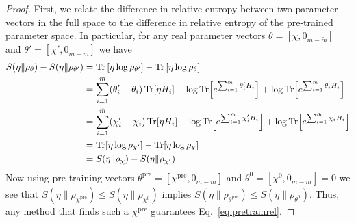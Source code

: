 \documentclass[
    aps,
    prx,
    onecolumn
]{revtex4-2}
\begin{document}
\begin{proof}
First, we relate the difference in relative entropy between two parameter vectors in the full space to the difference in relative entropy of the pre-trained parameter space. In particular, for any real parameter vectors $\theta = [\chi, 0_{m-\tilde{m}}]$ and $\theta' = [\chi', 0_{m-\tilde{m}}]$ we have
\begin{align}
\begin{split}
    S(\eta \|\rho_{\theta}) - S(\eta \|\rho_{\theta'}) &= \Tr\left[\eta \log \rho_{\theta'}\right] - \Tr\left[\eta \log \rho_\theta\right]\\
    &=\sum_{i=1}^m(\theta_i'-\theta_i)\Tr[\eta H_i] - \log\Tr[e^{\sum_{i=1}^m\theta_i'H_i}] + \log\Tr[e^{\sum_{i=1}^m\theta_iH_i}] \\
    &= \sum_{i=1}^{\tilde{m}}(\chi_i'-\chi_i)\Tr[\eta H_i] - \log\Tr[e^{\sum_{i=1}^{\tilde{m}}\chi_i'H_i}] + \log\Tr[e^{\sum_{i=1}^{\tilde{m}}\chi_iH_i}] \\
    &= \Tr[\eta \log \rho_{\chi'}] - \Tr[\eta \log \rho_\chi] \\
    &= S(\eta \|\rho_{\chi}) - S(\eta \|\rho_{\chi'})
\end{split}
\end{align}
Now using pre-training vectors $\theta^\mathrm{pre} = [\chi^{\mathrm{pre}}, 0_{m-\tilde{m}}]$ and $\theta^0 = [\chi^0, 0_{m-\tilde{m}}]=0$ we see that $S(\eta \|\rho_{\chi^{\mathrm{pre}}})\leq S(\eta \|\rho_{\chi^0})$ implies  $S(\eta \|\rho_{\theta^\mathrm{pre}}) \leq S(\eta \|\rho_{\theta^0})$. Thus, any method that finds such a $\chi^{\mathrm{pre}}$ guarantees Eq.~\eqref{eq:pretrainrel}.
\end{proof}
\end{document}
